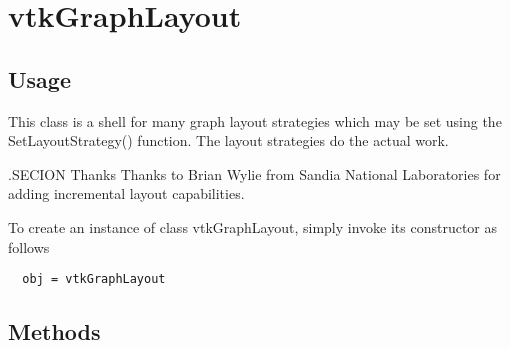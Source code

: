\section{vtkGraphLayout}

\subsection{Usage}

 This class is a shell for many graph layout strategies which may be set
 using the SetLayoutStrategy() function.  The layout strategies do the
 actual work.

 .SECION Thanks
 Thanks to Brian Wylie from Sandia National Laboratories for adding incremental
 layout capabilities.

To create an instance of class vtkGraphLayout, simply
invoke its constructor as follows
\begin{verbatim}
  obj = vtkGraphLayout
\end{verbatim}
\subsection{Methods}

